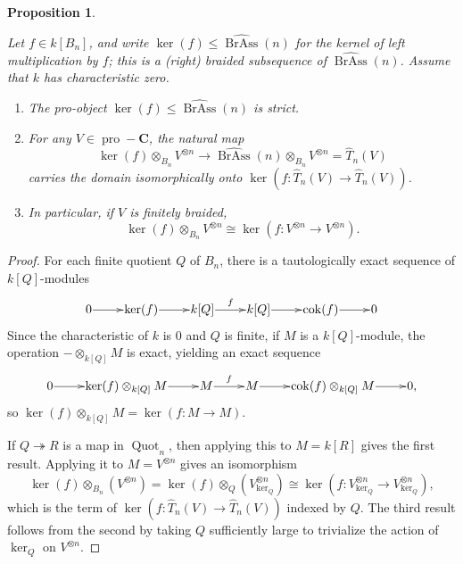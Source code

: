 \documentclass[12pt]{article}
\DeclareMathOperator{\Quot}{Quot}
\DeclareMathOperator{\pro}{pro}
\DeclareMathOperator{\BrAss}{BrAss}
\DeclareMathOperator{\cok}{cok}
\newcommand{\BrAsshat}{\widehat{\BrAss}} %
\newcommand{\That}{\widehat{T}}
\newcommand{\bC} {\mathbf{C}}
\newcommand{\proC}{\pro\!-\bC}
\theoremstyle{plain}
\newtheorem{prop}[thm]{Proposition}
\theoremstyle{definition}
\theoremstyle{remark}
\begin{document}
\begin{prop} \label{ker_prop}

Let $f \in k[B_n]$, and write $\ker(f) \leq \BrAsshat(n)$ for the kernel of left multiplication by $f$; this is a (right) braided subsequence of $\BrAsshat(n)$.  Assume that $k$ has characteristic zero.

\begin{enumerate}

\item The pro-object $\ker(f) \leq \BrAsshat(n)$ is strict. \label{strict_part}

\item For any $V \in \proC$, the natural map \label{ker_part} 
%
$$\ker(f) \otimes_{B_n} V^{\otimes n} \to \BrAsshat(n) \otimes_{B_n} V^{\otimes n} = \That_n(V)$$
%
carries the domain isomorphically onto $\ker(f: \That_n(V) \to \That_n(V))$.

\item In particular, if $V$ is finitely braided, 
%
$$\ker(f) \otimes_{B_n} V^{\otimes n} \cong \ker(f: V^{\otimes n} \to V^{\otimes n}).$$


\end{enumerate}

\end{prop}

\begin{proof}

For each finite quotient $Q$ of $B_n$, there is a tautologically exact sequence of $k[Q]$-modules
%
$$\xymatrix@1{ 0 \ar[r] & \ker(f) \ar[r] & k[Q] \ar[r]^-{f} & k[Q] \ar[r] & \cok(f) \ar[r] & 0}$$
%
Since the characteristic of $k$ is $0$ and $Q$ is finite, if $M$ is a $k[Q]$-module, the operation $-\otimes_{k[Q]} M$ is exact, yielding an exact sequence
%
$$\xymatrix@1{ 0 \ar[r] & \ker(f) \otimes_{k[Q]} M \ar[r] & M \ar[r]^-{f} & M \ar[r] & \cok(f) \otimes_{k[Q]} M  \ar[r] & 0,}$$
%
so $\ker(f) \otimes_{k[Q]} M = \ker(f: M \to M)$.  

If $Q \twoheadrightarrow R$ is a map in $\Quot_n$, then applying this to $M=k[R]$ gives the first result.  Applying it to $M = V^{\otimes n}$ gives an isomorphism
%
$$\ker(f) \otimes_{B_n} (V^{\otimes n}) = \ker(f) \otimes_{Q} (V^{\otimes n}_{\ker_Q}) \cong \ker(f: V^{\otimes n}_{\ker_Q} \to V^{\otimes n}_{\ker_Q}),$$
%
which is the term of $\ker(f: \That_n(V) \to \That_n(V))$ indexed by $Q$.  The third result follows from the second by taking $Q$ sufficiently large to trivialize the action of $\ker_Q$ on $V^{\otimes n}$.

\end{proof}
\end{document}
